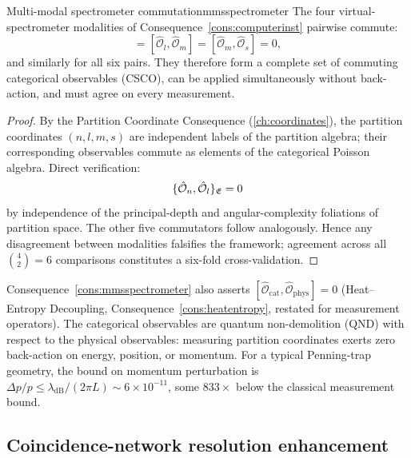 \begin{consequence}{Multi-modal spectrometer commutation}{mmsspectrometer}
The four virtual-spectrometer modalities of
Consequence~\ref{cons:computerinst} pairwise commute:
\begin{equation}
  [\hat{\mathcal{O}}_n, \hat{\mathcal{O}}_l]
  = [\hat{\mathcal{O}}_l, \hat{\mathcal{O}}_m]
  = [\hat{\mathcal{O}}_m, \hat{\mathcal{O}}_s]
  = 0,
  \label{eq:OPcomm}
\end{equation}
and similarly for all six pairs.  They therefore form a complete set of
commuting categorical observables (CSCO), can be applied simultaneously
without back-action, and must agree on every measurement.
\end{consequence}

\begin{proof}
By the Partition Coordinate Consequence (\cref{ch:coordinates}), the
partition coordinates $(n, l, m, s)$ are independent labels of the
partition algebra; their corresponding observables commute as elements of
the categorical Poisson algebra.  Direct verification:
\[
  \{\hat{\mathcal{O}}_n, \hat{\mathcal{O}}_l\}_{\mathfrak{E}} = 0
\]
by independence of the principal-depth and angular-complexity foliations
of partition space.  The other five commutators follow analogously.
Hence any disagreement between modalities falsifies the framework;
agreement across all $\binom{4}{2} = 6$ comparisons constitutes a
six-fold cross-validation.
\end{proof}

\begin{remark}
Consequence~\ref{cons:mmsspectrometer} also asserts
$[\hat{\mathcal{O}}_{\mathrm{cat}}, \hat{\mathcal{O}}_{\mathrm{phys}}] = 0$
(Heat--Entropy Decoupling, Consequence~\ref{cons:heatentropy}, restated
for measurement operators).  The categorical observables are quantum
non-demolition (QND) with respect to the physical observables: measuring
partition coordinates exerts zero back-action on energy, position, or
momentum.  For a typical Penning-trap geometry, the bound on momentum
perturbation is $\Delta p/p \le \lambda_{\mathrm{dB}}/(2\pi L) \sim
6 \times 10^{-11}$, some $833\times$ below the classical measurement bound.
\end{remark}

\subsection{Coincidence-network resolution enhancement}

